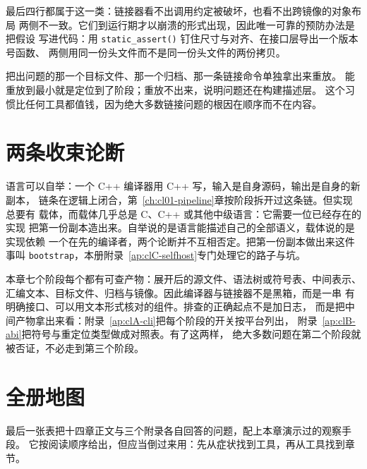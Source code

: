 \documentclass[12pt,a4paper,fontset=fandol]{ctexbook}
\newcommand{\cpp}[1]{C++#1}
\newcommand{\Fn}[1]{\texttt{#1()}}
\newcommand{\Lang}[1]{\textsf{#1}}
\newcommand{\CL}{\Lang{C}}
\newcommand{\Sw}[1]{\texttt{#1}}
\begin{document}
\begin{warning}[title={最贵的两类症状都不在链接期报错}]
最后四行都属于这一类：链接器看不出调用约定被破坏，也看不出跨镜像的对象布局
两侧不一致。它们到运行期才以崩溃的形式出现，因此唯一可靠的预防办法是把假设
写进代码：用 \Fn{static\_assert} 钉住尺寸与对齐、在接口层导出一个版本号函数、
两侧用同一份头文件而不是同一份头文件的两份拷贝。
\end{warning}

\begin{bestpractice}[title={排障时先复制产物，不要复制整个工程}]
把出问题的那一个目标文件、那一个归档、那一条链接命令单独拿出来重放。
能重放到最小就是定位到了阶段；重放不出来，说明问题还在构建描述层。
这个习惯比任何工具都值钱，因为绝大多数链接问题的根因在顺序而不在内容。
\end{bestpractice}

\section{两条收束论断}\label{sec:cl15-close}

\begin{note}[title={自举与载体是两件事}]
语言可以自举：一个 \cpp{} 编译器用 \cpp{} 写，输入是自身源码，输出是自身的新副本，
链条在逻辑上闭合，第~\ref{ch:cl01-pipeline}章按阶段拆开过这条链。但实现总要有
载体，而载体几乎总是 \CL{}、\cpp{} 或其他中级语言：它需要一位已经存在的实现
把第一份副本造出来。自举说的是语言能描述自己的全部语义，载体说的是实现依赖
一个在先的编译者，两个论断并不互相否定。把第一份副本做出来这件事叫
\Sw{bootstrap}，本册附录~\ref{ap:clC-selfhost}专门处理它的路子与坑。
\end{note}

\begin{flow}[title={流水线上没有黑箱}]
本章七个阶段每个都有可查产物：展开后的源文件、语法树或符号表、中间表示、
汇编文本、目标文件、归档与镜像。因此编译器与链接器不是黑箱，而是一串
有明确接口、可以用文本形式核对的组件。排查的正确起点不是加日志，
而是把中间产物拿出来看：附录~\ref{ap:clA-cli}把每个阶段的开关按平台列出，
附录~\ref{ap:clB-abi}把符号与重定位类型做成对照表。有了这两样，
绝大多数问题在第二个阶段就被否证，不必走到第三个阶段。
\end{flow}

\section{全册地图}\label{sec:cl15-map}

最后一张表把十四章正文与三个附录各自回答的问题，配上本章演示过的观察手段。
它按阅读顺序给出，但应当倒过来用：先从症状找到工具，再从工具找到章节。
\end{document}
